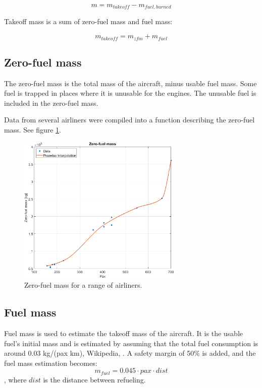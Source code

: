 \documentclass[english]{kththesis}
\begin{document}
\begin{equation}
\label{eq:ACmass}
m = m_{takeoff} - m_{fuel,burned}
\end{equation}

Takeoff mass is a sum of zero-fuel mass and fuel mass:

\begin{equation}
\label{eq:TOM}
m_{takeoff} = m_{zfm} + m_{fuel}
\end{equation}


\subsection{Zero-fuel mass}
\label{sec:zerofuelmass}
The zero-fuel mass is the total mass of the aircraft, minus usable fuel mass. Some fuel is trapped in places where it is unusable for the engines. The unusable fuel is included in the zero-fuel mass.

Data from several airliners were compiled into a function describing the zero-fuel mass. See figure \ref{fig:ZFM}.

\begin{figure}[!ht]
    \centering
    \includegraphics[width=0.7\textwidth]{Epictures/ZFM.png}
    \caption{Zero-fuel mass for a range of airliners.}
    \label{fig:ZFM}
\end{figure}

\clearpage

\subsection{Fuel mass}
\label{sec:fuelmass}
Fuel mass is used to estimate the takeoff mass of the aircraft. It is the usable fuel's initial mass and is estimated by assuming that the total fuel consumption is around 0.03 kg/(pax km), Wikipedia, \cite{WikiACFuelEconomy2021}. A safety margin of 50\% is added, and the fuel mass estimation becomes:
\begin{equation}
\label{eq:Fuelmass}
m_{fuel} = 0.045 \cdot pax \cdot dist
\end{equation}
, where $dist$ is the distance between refueling.
\end{document}
